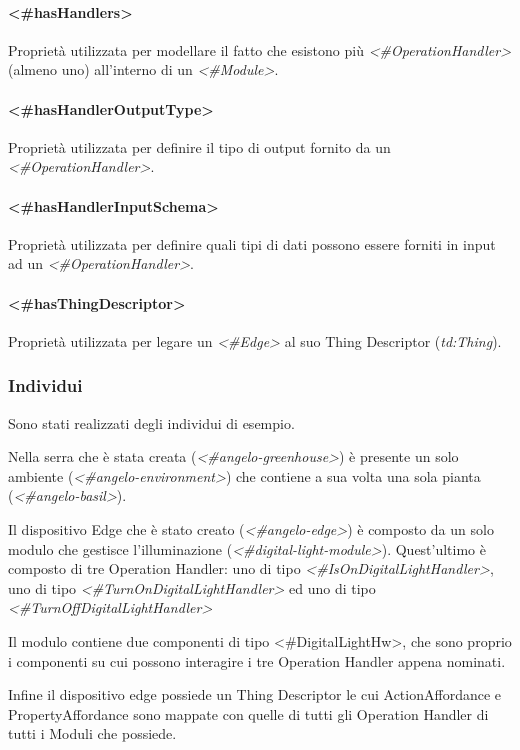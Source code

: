 \paragraph{<\#hasHandlers>}
Proprietà utilizzata per modellare il fatto che esistono più \textit{<\#OperationHandler>} (almeno uno) all'interno di un \textit{<\#Module>}.
\paragraph{<\#hasHandlerOutputType>}
Proprietà utilizzata per definire il tipo di output fornito da un \textit{<\#OperationHandler>}.
\paragraph{<\#hasHandlerInputSchema>}
Proprietà utilizzata per definire quali tipi di dati possono essere forniti in input ad un \textit{<\#OperationHandler>}.
\paragraph{<\#hasThingDescriptor>}
Proprietà utilizzata per legare un \textit{<\#Edge>} al suo Thing Descriptor (\textit{td:Thing}).

\subsubsection{Individui}
Sono stati realizzati degli individui di esempio.

\noindent Nella serra che è stata creata (\textit{<\#angelo-greenhouse>}) è presente un solo ambiente (\textit{<\#angelo-environment>}) che contiene a sua volta una sola pianta (\textit{<\#angelo-basil>}).

\noindent Il dispositivo Edge che è stato creato (\textit{<\#angelo-edge>}) è composto da un solo modulo che gestisce l'illuminazione (\textit{<\#digital-light-module>}). Quest'ultimo è composto di tre Operation Handler: uno di tipo \textit{<\#IsOnDigitalLightHandler>}, uno di tipo \textit{<\#TurnOnDigitalLightHandler>} ed uno di tipo \textit{<\#TurnOffDigitalLightHandler>}

\noindent Il modulo contiene due componenti di tipo <\#DigitalLightHw>, che sono proprio i componenti su cui possono interagire i tre Operation Handler appena nominati.

\noindent Infine il dispositivo edge possiede un Thing Descriptor le cui ActionAffordance e PropertyAffordance sono mappate con quelle di tutti gli Operation Handler di tutti i Moduli che possiede.
